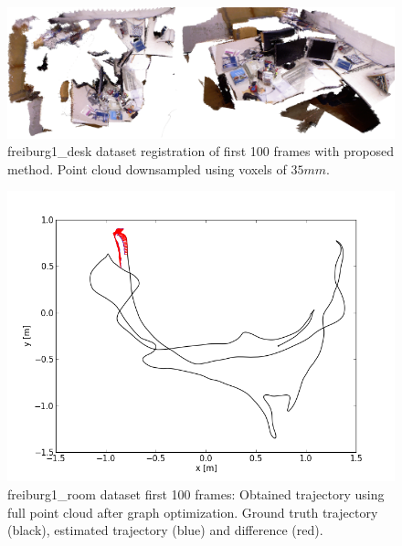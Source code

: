\begin{figure}[H]
\begin{center}
\includegraphics[scale=0.2]{images/freiburg1_desk.png}
\caption{freiburg1\_desk dataset registration of first 100 frames with proposed method. Point cloud downsampled using voxels of $35mm$.}
\label{fig:jan}
\end{center}
\end{figure}


\begin{figure}[H]
\begin{center}
\includegraphics[scale=0.75]{images/freiburg1_room_1_100_fullcloud_optimized.png}
\caption{freiburg1\_room dataset first 100 frames: Obtained trajectory using full point cloud after graph optimization. Ground truth trajectory (black), estimated trajectory (blue) and difference (red).}
\label{fig:jan}
\end{center}
\end{figure}


